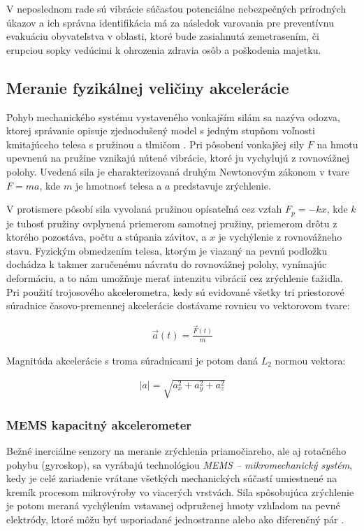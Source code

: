 V neposlednom rade sú vibrácie súčasťou potenciálne nebezpečných prírodných úkazov a ich správna identifikácia má za následok varovania pre preventívnu evakuáciu obyvateľstva v oblasti, ktoré bude zasiahnutá zemetrasením, či erupciou sopky vedúcimi k ohrozenia zdravia osôb a poškodenia majetku.
 
\subsection{Meranie fyzikálnej veličiny akcelerácie}
Pohyb mechanického systému vystaveného vonkajším silám sa nazýva odozva, ktorej správanie opisuje zjednodušený model s jedným stupňom voľnosti kmitajúceho telesa s pružinou a tlmičom \cite{vibrations-shock}. Pri pôsobení vonkajšej sily $F$ na hmotu upevnenú na pružine vznikajú nútené vibrácie, ktoré ju vychylujú z rovnovážnej polohy. Uvedená sila je charakterizovaná druhým Newtonovým zákonom v tvare $F = ma$, kde $m$ je hmotnosť telesa a $a$ predstavuje zrýchlenie. 

V protismere pôsobí sila vyvolaná pružinou opísateľná cez vzťah $F_p = -kx$, kde $k$ je tuhosť pružiny ovplynená priemerom samotnej pružiny, priemerom drôtu z ktorého pozostáva, počtu a stúpania závitov, a $x$ je vychýlenie z rovnovážneho stavu. Fyzickým obmedzením telesa, ktorým je viazaný na pevnú podložku dochádza k takmer zaručenému návratu do rovnovážnej polohy, vynímajúc deformáciu, a to nám umožňuje merať intenzitu vibrácií cez zrýchlenie ťažidla. Pri použití trojosového akcelerometra, kedy sú evidované všetky tri priestorové súradnice časovo-premennej akcelerácie dostávame rovnicu vo vektorovom tvare: 
\begin{ceqn}\begin{align}
   \vec{a}(t) = \frac{\vec{F}(t)}{m}
\end{align}\end{ceqn}

Magnitúda akcelerácie s troma súradnicami je potom daná $L_2$ normou vektora:
\begin{ceqn}\begin{align}
   |a| = \sqrt{a_x^2 + a_y^2 + a_z^2}
\end{align}\end{ceqn}

\subsubsection{MEMS kapacitný akcelerometer}
Bežné inerciálne senzory na meranie zrýchlenia priamočiareho, ale aj rotačného pohybu (gyroskop), sa vyrábajú technológiou \emph{MEMS – mikromechanický systém}, kedy je celé zariadenie vrátane všetkých mechanických súčastí umiestnené na kremík procesom mikrovýroby vo viacerých vrstvách. Sila spôsobujúca zrýchlenie je potom meraná vychýlením vstavanej odpruženej hmoty vzhľadom na pevné elektródy, ktoré môžu byť usporiadané jednostranne alebo ako diferenčný pár \cite{mdof-mems-accelerometers}.

